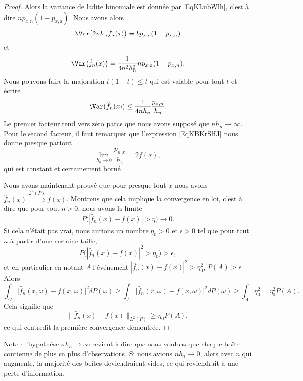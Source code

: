 \begin{proof}
    Alors la variance de ladite binomiale est donnée par \eqref{EqKLubWlh}, c'est à dire \( np_{x,n}(1-p_{x,n})\). Nous avons alors
    \begin{equation}
         \Var\big( 2nh_n\hat f_n(x) \big)=bp_{x,n}(1-p_{x,n})
    \end{equation}
    et
    \begin{equation}
        \Var\big( \hat f_n(x) \big)=\frac{1}{ 4n^2h_n^2 }np_{x,n}(1-p_{x,n}).
    \end{equation}
    Nous pouvons faire la majoration \( t(1-t)\leq t\) qui est valable pour tout \( t\) et écrire
    \begin{equation}
        \Var(\hat f_n(x))\leq \frac{1}{ 4nh_n }\frac{ p_{x,n} }{ h_n }.
    \end{equation}
    Le premier facteur tend vers zéro parce que nous avons supposé que \( nh_n\to \infty\). Pour le second facteur, il faut remarquer que l'expression \eqref{EqKBKrSHJ} nous donne presque partout
    \begin{equation}
        \lim_{h_n\to 0} \frac{ p_{n,x} }{ h_n }=2f(x),
    \end{equation}
    qui est constant et certainement borné.

    Nous avons maintenant prouvé que pour presque tout \( x\) nous avons \( \hat f_n(x)\stackrel{L^2(P)}{\to}f(x)\). Montrons que cela implique la convergence en loi, c'est à dire que pour tout \( \eta>0\), nous avons la limite
    \begin{equation}
        P\big( | \hat f_n(x)-f(x) |>\eta \big)\to 0.
    \end{equation}
    Si cela n'était pas vrai, nous aurions un nombre \( \eta_0>0\) et \( \epsilon>0\) tel que pour tout \( n\) à partir d'une certaine taille,
    \begin{equation}
        P\Big( | \hat f_n(x)-f(x) |^2>\eta_0 \Big)>\epsilon,
    \end{equation}
    et en particulier en notant \( A\) l'événement \( | \hat f_n(x)-f(x) |^2>\eta_0^2\), \( P(A)>\epsilon\). Alors 
    \begin{equation}
        \int_{\Omega}\big| \hat f_n(x,\omega)-f(x,\omega) \big|^2dP(\omega)\geq \int_A\big| \hat f_n(x,\omega)-f(x,\omega) \big|^2dP(\omega)\geq\int_A\eta_0^2=\eta_0^2P(A).
    \end{equation}
    Cela signifie que
    \begin{equation}
        \| \hat f_n(x)-f(x) \|_{L^2(P)}\geq \eta_0P(A),
    \end{equation}
    ce qui contredit la première convergence démontrée.
\end{proof}
Note : l'hypothèse \( nh_n\to\infty\) revient à dire que nous voulons que chaque boîte contienne de plus en plus d'observations. Si nous avions \( nh_n\to 0\), alors avec \( n\) qui augmente, la majorité des boîtes deviendraient vides, ce qui reviendrait à une perte d'information.

